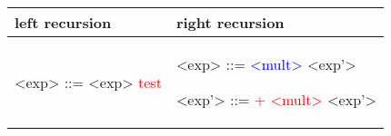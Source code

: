 \begin{center}
	\begin{tabular}{p{7cm} | p{7cm}}
		left recursion
		&
		right recursion
		\\
		\hline

		
		\begin{grammarEx}
			<exp> ::= <exp> \textcolor{red}{test}
			\alt \textcolor{blue}{\textbeta}
		\end{grammarEx}
		
		&
		
		\begin{grammarEx}
			<exp> ::= \textcolor{blue}{\textless mult\textgreater} <exp'>
			
			<exp'> ::= \textcolor{red}{+ \textless mult\textgreater} <exp'>
			\alt \textemptyword{}
		\end{grammarEx}
		
	\end{tabular}
\end{center}